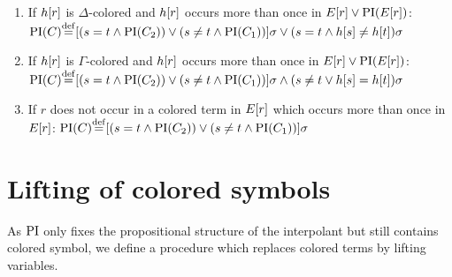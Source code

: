 \begin{defi}
\begin{itemize}
\begin{enumerate}
				\item If $h[r]$ is $\Delta$-colored and $h[r]$ occurs more than once in $E[r] \lor \operatorname{PI}(E[r])$:
					\label{def:PI_paramod_1}
					\newline
					$\PI(C) \defeq{} [ ( s=t \land \PI(C_2) ) \lor (s\neq t \land \PI(C_1)) ]\sigma \lor (s=t \land h\occur{s} \neq      h\occur{t})\sigma$
				\item If $h[r]$ is $\Gamma$-colored and $h[r]$ occurs more than once in $E[r] \lor \operatorname{PI}(E[r])$:
					\label{def:PI_paramod_2}
					\newline
					$\PI(C) \defeq{} [ ( s=t \land \PI(C_2) ) \lor (s\neq t \land \PI(C_1)) ]\sigma \land (s\neq t \lor h\occur{s} =     h\occur{t})\sigma$
				\item If $r$ does not occur in a colored term in $E[r]$ which occurs more than once in\nolinebreak{} $E[r]$:
					\label{def:PI_paramod_3}
					\newline
					$\PI(C) \defeq{} [ ( s=t \land \PI(C_2) ) \lor (s\neq t \land \PI(C_1)) ]\sigma$ \qedhere

			\end{enumerate}

	\end{itemize}
\end{defi}




\section{Lifting of colored symbols}
As $\operatorname{PI}$ only fixes the propositional structure of the interpolant but still contains colored symbol, 
we define a procedure which replaces colored terms by lifting variables.


